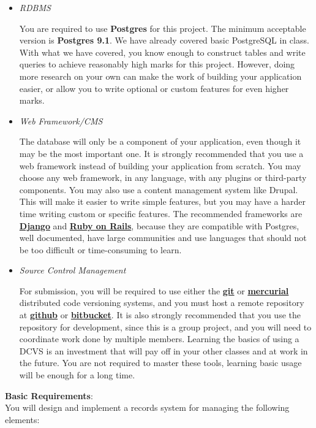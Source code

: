 \documentclass[12pt]{article}
\begin{document}
\begin{itemize}
\item \textit{RDBMS}
  
You are required to use \textbf{Postgres} for this project. The minimum acceptable version is \textbf{Postgres 9.1}. We have already covered basic PostgreSQL in class. With what we have covered, you know enough to construct tables and write queries to achieve reasonably high marks for this project. However, doing more research on your own can make the work of building your application easier, or allow you to write optional or custom features for even higher marks. 

\item \textit{Web Framework/CMS}

The database will only be a component of your application, even though it may be the most important one. It is strongly recommended that you use a web framework instead of building your application from scratch. You may choose any web framework, in any language, with any plugins or third-party components. You may also use a content management system like Drupal. This will make it easier to write simple features, but you may have a harder time writing custom or specific features. The recommended frameworks are \href{https://www.djangoproject.com/}{\textbf{Django}} and \href{http://rubyonrails.org/}{\textbf{Ruby on Rails}}, because they are compatible with Postgres, well documented, have large communities and use languages that should not be too difficult or time-consuming to learn.

\item \textit{Source Control Management}

For submission, you will be required to use either the \href{http://git-scm.com/}{\textbf{git}} or \href{http://mercurial.selenic.com/}{\textbf{mercurial}} distributed code versioning systems, and you must host a remote repository at \href{https://github.com/}{\textbf{github}} or \href{https://bitbucket.org/}{\textbf{bitbucket}}. It is also strongly recommended that you use the repository for development, since this is a group project, and you will need to coordinate work done by multiple members. Learning the basics of using a DCVS is an investment that will pay off in your other classes and at work in the future. You are not required to master these tools, learning basic usage will be enough for a long time.

\end{itemize}

\newpage
\noindent \textbf{Basic Requirements}: \\
You will design and implement a records system for managing the following elements: 
\end{document}
